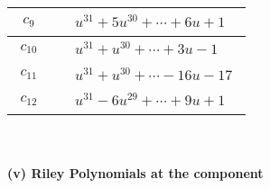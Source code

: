 \documentclass[1p]{elsarticle_modified}
\theoremstyle{definition}
\begin{document}
\begin{tabular}{m{50pt}|m{274pt}}
\hline $$\begin{aligned}c_{9}\end{aligned}$$&$\begin{aligned}
&u^{31}+5 u^{30}+\cdots+6 u+1
\end{aligned}$\\
\hline $$\begin{aligned}c_{10}\end{aligned}$$&$\begin{aligned}
&u^{31}+u^{30}+\cdots+3 u-1
\end{aligned}$\\
\hline $$\begin{aligned}c_{11}\end{aligned}$$&$\begin{aligned}
&u^{31}+u^{30}+\cdots-16 u-17
\end{aligned}$\\
\hline $$\begin{aligned}c_{12}\end{aligned}$$&$\begin{aligned}
&u^{31}-6 u^{29}+\cdots+9 u+1
\end{aligned}$\\
\hline
\end{tabular}\\~\\
\newpage\renewcommand{\arraystretch}{1}
\flushleft \textbf{(v) Riley Polynomials at the component}\newline \\
\end{document}
